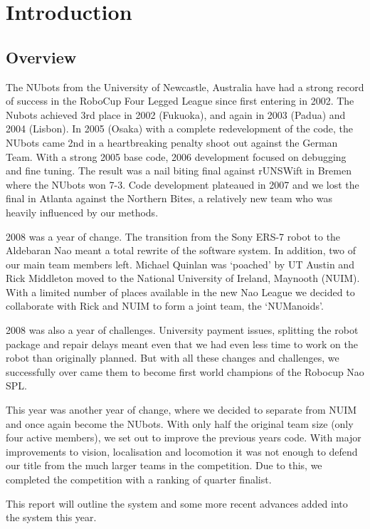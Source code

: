 \section{Introduction}

\subsection{Overview}

The NUbots from the University of Newcastle, Australia have had a strong record of success in the RoboCup Four Legged League since first entering in 2002. The Nubots achieved 3rd place in 2002 (Fukuoka), and again in 2003 (Padua) and 2004 (Lisbon). In 2005 (Osaka) with a complete redevelopment of the code, the NUbots came 2nd in a heartbreaking penalty shoot out against the German Team. With a strong 2005 base code, 2006 development focused on debugging and fine tuning. The result was a nail biting final against rUNSWift in Bremen where the NUbots won 7-3. Code development plateaued in 2007 and we lost the final in Atlanta against the Northern Bites, a relatively new team who was heavily influenced by our methods.  

2008 was a year of change. The transition from the Sony ERS-7 robot to the Aldebaran Nao meant a total rewrite of the software system. In addition, two of our main team members left. Michael Quinlan was `poached' by UT Austin and Rick Middleton moved to the National University of Ireland, Maynooth (NUIM). With a limited number of places available in the new Nao League we decided to collaborate with Rick and NUIM to form a joint team, the `NUManoids'. 

2008 was also a year of challenges. University payment issues, splitting the robot package and repair delays meant even that we had even less time to work on the robot than originally planned. But with all these changes and challenges, we successfully over came them to become first world champions of the Robocup Nao SPL. 

This year was another year of change, where we decided to separate from NUIM and once again become the NUbots. With only half the original team size (only four active members), we set out to improve the previous years code. With major improvements to vision, localisation and locomotion it was not enough to defend our title from the much larger teams in the competition. Due to this, we completed the competition with a ranking of quarter finalist.

This report will outline the system and some more recent advances added into the system this year.

